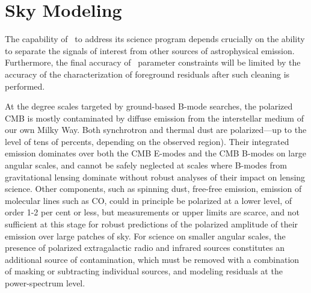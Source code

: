 
%
%

\section{Sky Modeling}
\label{sec:skymodel}

The capability of \cmbexp\ to address its science program depends crucially on the ability to separate the signals of interest from other sources of astrophysical emission. Furthermore, the final accuracy of \cmbexp\ parameter constraints will be limited by the accuracy of the characterization of foreground residuals after such cleaning is performed. 

At the degree scales targeted by ground-based B-mode searches, the polarized CMB is mostly contaminated by diffuse emission from the interstellar medium of our own Milky Way. Both synchrotron and thermal dust are polarized---up to the level of tens of percents, depending on the observed region). Their integrated emission dominates over both the CMB E-modes and the CMB B-modes on large angular scales, and cannot be safely neglected at scales where B-modes from gravitational lensing dominate without robust analyses of their impact on lensing science. Other components, such as spinning dust, free-free emission, emission of molecular lines such as CO, could in principle be polarized at a lower level, of order 1-2 per cent or less, but measurements or upper limits are scarce, and not sufficient at this stage for robust predictions of the polarized amplitude of their emission over large patches of sky. For science on smaller angular scales, the presence of polarized extragalactic radio and infrared sources constitutes an additional source of contamination, which must be removed with a combination of masking or subtracting individual sources, and modeling residuals at the power-spectrum level.

